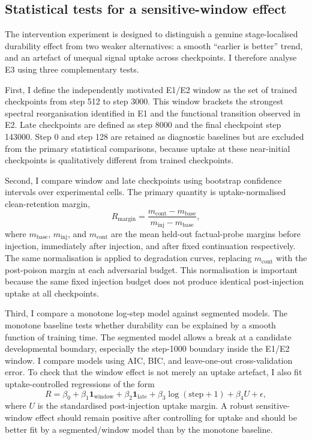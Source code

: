 \subsection{Statistical tests for a sensitive-window effect}
\label{sec:e3-statistical-tests}

The intervention experiment is designed to distinguish a genuine stage-localised durability effect from two weaker alternatives: a smooth ``earlier is better'' trend, and an artefact of unequal signal uptake across checkpoints.  I therefore analyse E3 using three complementary tests.

First, I define the independently motivated E1/E2 window as the set of trained checkpoints from step 512 to step 3000.  This window brackets the strongest spectral reorganisation identified in E1 and the functional transition observed in E2.  Late checkpoints are defined as step 8000 and the final checkpoint step 143000.  Step 0 and step 128 are retained as diagnostic baselines but are excluded from the primary statistical comparisons, because uptake at these near-initial checkpoints is qualitatively different from trained checkpoints.

Second, I compare window and late checkpoints using bootstrap confidence intervals over experimental cells.  The primary quantity is uptake-normalised clean-retention margin,
\[
R_{\mathrm{margin}} =
\frac{m_{\mathrm{cont}} - m_{\mathrm{base}}}{m_{\mathrm{inj}} - m_{\mathrm{base}}},
\]
where \(m_{\mathrm{base}}\), \(m_{\mathrm{inj}}\), and \(m_{\mathrm{cont}}\) are the mean held-out factual-probe margins before injection, immediately after injection, and after fixed continuation respectively.  The same normalisation is applied to degradation curves, replacing \(m_{\mathrm{cont}}\) with the post-poison margin at each adversarial budget.  This normalisation is important because the same fixed injection budget does not produce identical post-injection uptake at all checkpoints.

Third, I compare a monotone log-step model against segmented models.  The monotone baseline tests whether durability can be explained by a smooth function of training time.  The segmented model allows a break at a candidate developmental boundary, especially the step-1000 boundary inside the E1/E2 window.  I compare models using AIC, BIC, and leave-one-out cross-validation error.  To check that the window effect is not merely an uptake artefact, I also fit uptake-controlled regressions of the form
\[
R = \beta_0 + \beta_1 \mathbf{1}_{\mathrm{window}} + \beta_2 \mathbf{1}_{\mathrm{late}}
+ \beta_3 \log(\mathrm{step}+1) + \beta_4 U + \epsilon,
\]
where \(U\) is the standardised post-injection uptake margin.  A robust sensitive-window effect should remain positive after controlling for uptake and should be better fit by a segmented/window model than by the monotone baseline.
